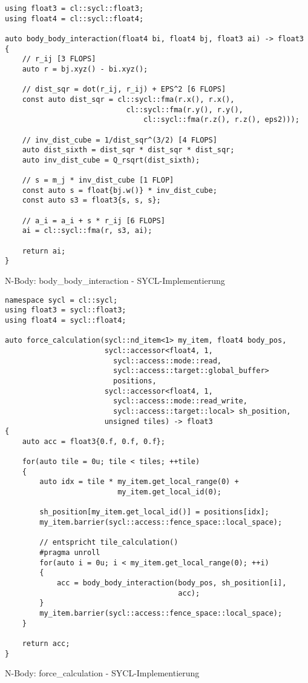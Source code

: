 \begin{code}
    \begin{verbatim}
using float3 = cl::sycl::float3;
using float4 = cl::sycl::float4;

auto body_body_interaction(float4 bi, float4 bj, float3 ai) -> float3
{
    // r_ij [3 FLOPS]
    auto r = bj.xyz() - bi.xyz();

    // dist_sqr = dot(r_ij, r_ij) + EPS^2 [6 FLOPS]
    const auto dist_sqr = cl::sycl::fma(r.x(), r.x(),
                            cl::sycl::fma(r.y(), r.y(),
                                cl::sycl::fma(r.z(), r.z(), eps2)));

    // inv_dist_cube = 1/dist_sqr^(3/2) [4 FLOPS]
    auto dist_sixth = dist_sqr * dist_sqr * dist_sqr;
    auto inv_dist_cube = Q_rsqrt(dist_sixth);

    // s = m_j * inv_dist_cube [1 FLOP]
    const auto s = float{bj.w()} * inv_dist_cube;
    const auto s3 = float3{s, s, s};

    // a_i = a_i + s * r_ij [6 FLOPS]
    ai = cl::sycl::fma(r, s3, ai);

    return ai;
}
    \end{verbatim}
    \caption{N-Body: body\_body\_interaction - SYCL-Implementierung}
    \label{anhang:sycl:bodybodyinteraction}
\end{code}

\begin{code}
    \begin{verbatim}
namespace sycl = cl::sycl;
using float3 = sycl::float3;
using float4 = sycl::float4;

auto force_calculation(sycl::nd_item<1> my_item, float4 body_pos,
                       sycl::accessor<float4, 1,
                         sycl::access::mode::read,
                         sycl::access::target::global_buffer>
                         positions,
                       sycl::accessor<float4, 1, 
                         sycl::access::mode::read_write,
                         sycl::access::target::local> sh_position,
                       unsigned tiles) -> float3
{
    auto acc = float3{0.f, 0.f, 0.f};

    for(auto tile = 0u; tile < tiles; ++tile)
    {
        auto idx = tile * my_item.get_local_range(0) +
                          my_item.get_local_id(0);

        sh_position[my_item.get_local_id()] = positions[idx];
        my_item.barrier(sycl::access::fence_space::local_space);

        // entspricht tile_calculation()
        #pragma unroll
        for(auto i = 0u; i < my_item.get_local_range(0); ++i)
        {
            acc = body_body_interaction(body_pos, sh_position[i],
                                        acc);
        }
        my_item.barrier(sycl::access::fence_space::local_space);
    }

    return acc;
}
    \end{verbatim}
    \caption{N-Body: force\_calculation - SYCL-Implementierung}
    \label{anhang:sycl:forcecalculation}
\end{code}

